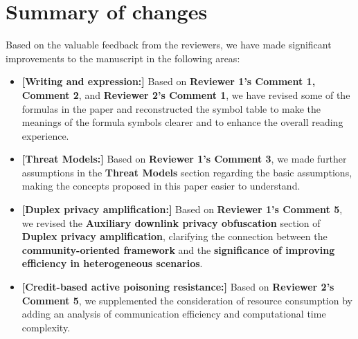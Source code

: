 \documentclass[a4paper,twoside,11pt,dvipsnames]{reviewresponse}
\begin{document}
\section{Summary of changes}
Based on the valuable feedback from the reviewers, we have made significant improvements to the manuscript in the following areas:
\color{red}
\begin{itemize}

\item \textbf{[Writing and expression:]} Based on \textbf{Reviewer 1's Comment 1, Comment 2}, and \textbf{Reviewer 2's Comment 1}, we have revised some of the formulas in the paper and reconstructed the symbol table to make the meanings of the formula symbols clearer and to enhance the overall reading experience.

\item \textbf{[Threat Models:]} Based on \textbf{Reviewer 1's Comment 3}, we made further assumptions in the \textbf{Threat Models} section regarding the basic assumptions, making the concepts proposed in this paper easier to understand.


\item \textbf{[Duplex privacy amplification:]} Based on \textbf{Reviewer 1's Comment 5}, we revised the \textbf{Auxiliary downlink privacy obfuscation} section of \textbf{Duplex privacy amplification}, clarifying the connection between the \textbf{community-oriented framework} and the \textbf{significance of improving efficiency in heterogeneous scenarios}.


\item \textbf{[Credit-based active poisoning resistance:]} Based on \textbf{Reviewer 2's Comment 5}, we supplemented the consideration of resource consumption by adding an analysis of communication efficiency and computational time complexity.



\end{itemize}
\end{document}
